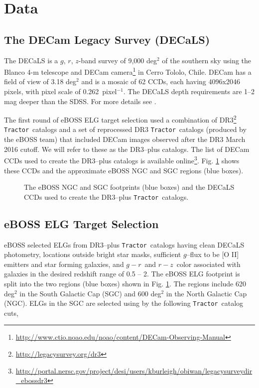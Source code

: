 \documentclass[a4paper,fleqn,usenatbib]{mnras}
\newcommand{\gb}{$g$}
\newcommand{\rband}{$r$}
\newcommand{\zb}{$z$}
\newcommand{\grcolor}{$g - r$}
\newcommand{\rzcolor}{$r - z$}
\newcommand{\tractor}{{\tt Tractor}}
\begin{document}
\section{Data}
\label{sec:data}

\subsection{The DECam Legacy Survey (DECaLS)}

The DECaLS is a \gb, \rband, \zb-band survey of 9,000 deg$^2$ of the southern sky using the Blanco 4-m telescope and DECam camera\footnote{\url{http://www.ctio.noao.edu/noao/content/DECam-Observing-Manual}} in Cerro Tololo, Chile. DECam has a field of view of 3.18 deg$^2$ and is a mosaic of 62 CCDs, each having 4096x2046 pixels, with pixel scale of 0.262\arcsec\, pixel$^{-1}$. The DECaLS depth requirements are 1--2 mag deeper than the SDSS. For more details see \cite{overviewPaper, strategyPaper}.

The first round of eBOSS ELG target selection \citep{anand17} used a combination of DR3\footnote{\url{http://legacysurvey.org/dr3}} \tractor\, catalogs and a set of reprocessed DR3 \tractor\, catalogs (produced by the eBOSS team) that included DECam images observed after the DR3 March 2016 cutoff.  We will refer to these as the DR3--plus catalogs. The list of DECam CCDs used to create the DR3--plus catalogs is available online\footnote{\url{http://portal.nersc.gov/project/desi/users/kburleigh/obiwan/legacysurveydir_ebossdr3}}. Fig. \ref{fig:ccds-eboss} shows these CCDs and the approximate eBOSS NGC and SGC regions (blue boxes). 

\begin{figure}
     \hfill
\caption{The eBOSS NGC and SGC footprints (blue boxes) and the DECaLS CCDs used to create the DR3--plus \tractor\, catalogs.}
\label{fig:ccds-eboss}
\end{figure}

\subsection{eBOSS ELG Target Selection}
\label{sec:eboss-ts}

eBOSS selected ELGs from DR3--plus \tractor\, catalogs having clean DECaLS photometry, locations outside bright star masks, sufficient \gb--flux to be [O II] emitters and star forming galaxies, and \grcolor\, and \rzcolor\, color associated with galaxies in the desired redshift range of 0.5 -- 2. The eBOSS ELG footprint is split into the two regions (blue boxes) shown in Fig. \ref{fig:ccds-eboss}. The regions include 620 deg$^2$ in the South Galactic Cap (SGC) and 600 deg$^2$ in the North Galactic Cap (NGC). ELGs in the SGC are selected using by the following \tractor\, catalog cuts,
\end{document}
